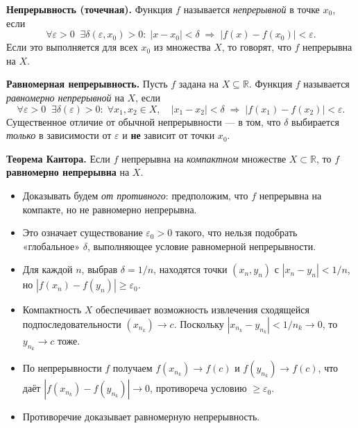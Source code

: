 

\textbf{Непрерывность (точечная).}
Функция $f$ называется \emph{непрерывной} в точке $x_0$, если
\[
\forall \varepsilon>0\;\;\exists \delta(\varepsilon, x_0)>0:\;
|x - x_0|<\delta \;\Longrightarrow\; |f(x)-f(x_0)|<\varepsilon.
\]
Если это выполняется для всех $x_0$ из множества $X$, то говорят, что $f$ непрерывна на $X$.

\medskip

\textbf{Равномерная непрерывность.}
Пусть $f$ задана на $X\subseteq \mathbb{R}$. Функция $f$ называется \emph{равномерно непрерывной} на $X$, если
\[
\forall \varepsilon>0\;\;\exists \delta(\varepsilon)>0:\;
\forall x_1, x_2 \in X,\quad |x_1 - x_2| < \delta
\;\Longrightarrow\; |f(x_1)-f(x_2)| < \varepsilon.
\]
Существенное отличие от обычной непрерывности — в том, что \(\delta\) выбирается \emph{только} в зависимости от \(\varepsilon\) и \textbf{не} зависит от точки $x_0$.

\medskip


\textbf{Теорема Кантора.}
Если $f$ непрерывна на \emph{компактном} множестве $X\subset \mathbb{R}$, то $f$ \textbf{равномерно непрерывна} на $X$.

\medskip


\begin{itemize}
  \item Доказывать будем \emph{от противного}: предположим, что $f$ непрерывна на компакте, но не равномерно непрерывна.
  \item Это означает существование $\varepsilon_0>0$ такого, что нельзя подобрать «глобальное» $\delta$, выполняющее условие равномерной непрерывности.
  \item Для каждой $n$, выбрав $\delta=1/n$, находятся точки $(x_n,y_n)$ с $|x_n-y_n|<1/n$, но $|f(x_n)-f(y_n)|\ge \varepsilon_0$.
  \item Компактность $X$ обеспечивает возможность извлечения сходящейся подпоследовательности $(x_{n_k}) \to c$. Поскольку $|x_{n_k}-y_{n_k}|<1/{n_k}\to0$, то $y_{n_k}\to c$ тоже.
  \item По непрерывности $f$ получаем $f(x_{n_k})\to f(c)$ и $f(y_{n_k})\to f(c)$, что даёт $|f(x_{n_k})-f(y_{n_k})|\to 0$, противореча условию \(\ge \varepsilon_0\).
  \item Противоречие доказывает равномерную непрерывность.
\end{itemize}

